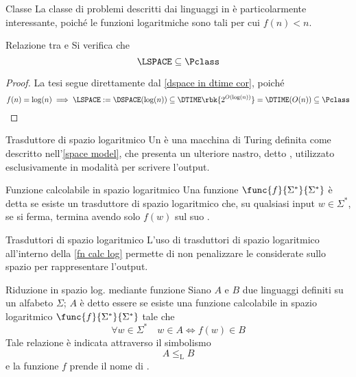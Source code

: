 \documentclass[a4paper, 12pt]{report}
\begin{document}
    \begin{framedobs}{Classe \LSPACE}
        La classe di problemi descritti dai linguaggi in \LSPACE è particolarmente interessante, poiché le funzioni logaritmiche sono tali per cui $f(n) < n$.
    \end{framedobs}

    \begin{framedprop}[label={l in p}]{Relazione tra \LSPACE e \Pclass}
        Si verifica che $$\LSPACE \subseteq \Pclass$$
    \end{framedprop}

    \begin{proof}
        La tesi segue direttamente dal \cref{dspace in dtime cor}, poiché $$f(n) = \log(n) \implies \LSPACE := \DSPACE(\log(n)) \subseteq \DTIME \rbk{2^{O(\log(n))}} = \DTIME(O(n)) \subseteq \Pclass$$
    \end{proof}

    \begin{frameddefn}{Trasduttore di spazio logaritmico}
        Un  è una macchina di Turing definita come descritto nell'\cref{space model}, che presenta un ulteriore nastro, detto , utilizzato esclusivamente in modalità  per scrivere l'output.
    \end{frameddefn}

    \begin{frameddefn}[label={fn calc log}]{Funzione calcolabile in spazio logaritmico}
        Una funzione $\func{f}{\Sigma^*}{\Sigma^*}$ è detta  se esiste un trasduttore di spazio logaritmico che, su qualsiasi input $w \in \Sigma^*$, se si ferma, termina avendo solo $f(w)$ sul suo .
    \end{frameddefn}

    \begin{framedobs}{Trasduttori di spazio logaritmico}
        L'uso di trasduttori di spazio logaritmico all'interno della \cref{fn calc log} permette di non penalizzare le \TM considerate sullo spazio per rappresentare l'output.
    \end{framedobs}

    \begin{frameddefn}{Riduzione in spazio log. mediante funzione}
        Siano $A$ e $B$ due linguaggi definiti su un alfabeto $\Sigma$; $A$ è detto essere  se esiste una funzione calcolabile in spazio logaritmico $\func{f}{\Sigma^*}{\Sigma^*}$  tale che $$\forall w \in \Sigma^* \quad w \in A \iff f(w) \in B$$ Tale relazione è indicata attraverso il simbolismo $$A \leq_\mathrm L B$$ e la funzione $f$ prende il nome di .
    \end{frameddefn}
\end{document}

